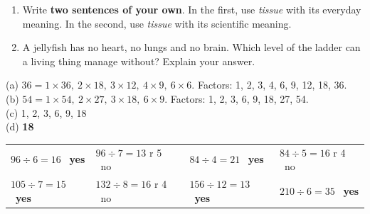 \documentclass[12pt,a4paper]{article}
\newif\ifkey
\begin{document}
\begin{enumerate}[label=\arabic*., itemsep=11pt]

  \item Write \textbf{two sentences of your own}. In the first, use \emph{tissue} with
        its everyday meaning. In the second, use \emph{tissue} with its scientific
        meaning.

  \item A jellyfish has no heart, no lungs and no brain. Which level of the ladder can
        a living thing manage without? Explain your answer.

\end{enumerate}

\ifkey
\newpage
{}

\linespread{1.0}\selectfont
{}

\noindent (a) $36 = 1\times36,\ 2\times18,\ 3\times12,\ 4\times9,\ 6\times6$.
Factors: 1, 2, 3, 4, 6, 9, 12, 18, 36. \\
(b) $54 = 1\times54,\ 2\times27,\ 3\times18,\ 6\times9$.
Factors: 1, 2, 3, 6, 9, 18, 27, 54. \\
(c) 1, 2, 3, 6, 9, 18 \\
(d) \textbf{18}

\smallskip
{}

\noindent
\begin{tabularx}{\linewidth}{@{}p{4.1cm}p{4.1cm}p{4.1cm}X@{}}
  $96 \div 6 = 16$ \ \textbf{yes} & $96 \div 7 = 13$ r 5 \ no &
  $84 \div 4 = 21$ \ \textbf{yes} & $84 \div 5 = 16$ r 4 \ no \\
  $105 \div 7 = 15$ \ \textbf{yes} & $132 \div 8 = 16$ r 4 \ no &
  $156 \div 12 = 13$ \ \textbf{yes} & $210 \div 6 = 35$ \ \textbf{yes} \\
\end{tabularx}
\end{document}
